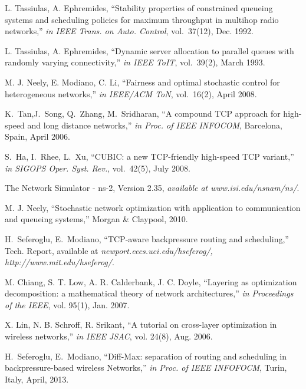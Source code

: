 \documentclass[conference]{IEEEtran}
\begin{document}

\begin{thebibliography}{}
 L. Tassiulas, A. Ephremides, ``Stability properties of constrained queueing systems and scheduling policies for maximum throughput in multihop radio networks,'' {\em in IEEE Trans. on Auto. Control}, vol.~37(12), Dec. 1992.

 L. Tassiulas, A. Ephremides, ``Dynamic server allocation to parallel queues with randomly varying connectivity,'' {\em in IEEE ToIT}, vol.~39(2), March 1993.

 M. J. Neely, E. Modiano, C. Li, ``Fairness and optimal stochastic control for heterogeneous networks,'' {\em in IEEE/ACM ToN}, vol.~16(2), April 2008.

 K.~Tan,J.~Song, Q.~Zhang, M.~Sridharan, ``A compound TCP approach for high-speed and long distance networks,'' {\em in Proc. of IEEE INFOCOM}, Barcelona, Spain, April 2006.

 S.~Ha, I.~Rhee, L.~Xu, ``CUBIC: a new TCP-friendly high-speed TCP variant,'' {\em in SIGOPS Oper. Syst. Rev.}, vol.~42(5), July 2008.

 The Network Simulator - ns-2, Version 2.35, {\em available at www.isi.edu/nsnam/ns/}.

 M. J. Neely, ``Stochastic network optimization with application to communication and queueing systems,'' Morgan \& Claypool, 2010.



 H.~Seferoglu, E.~Modiano, ``TCP-aware backpressure routing and scheduling,'' Tech. Report, available at {\em newport.eecs.uci.edu/{\texttildelow}hseferog/, http://www.mit.edu/{\texttildelow}hseferog/}.

 M. Chiang, S. T. Low, A. R. Calderbank, J. C. Doyle, ``Layering as optimization decomposition: a mathematical theory of network architectures,'' \emph{in Proceedings of the IEEE}, vol. 95(1), Jan. 2007.

 X. Lin, N. B. Schroff, R. Srikant, ``A tutorial on cross-layer optimization in wireless networks,'' {\em in IEEE JSAC}, vol. 24(8), Aug. 2006.

 H.~Seferoglu, E.~Modiano, ``Diff-Max: separation of routing and scheduling in backpressure-based wireless Networks,'' {\em in Proc. of IEEE INFOFOCM}, Turin, Italy, April, 2013.


\end{thebibliography}
\end{document}
